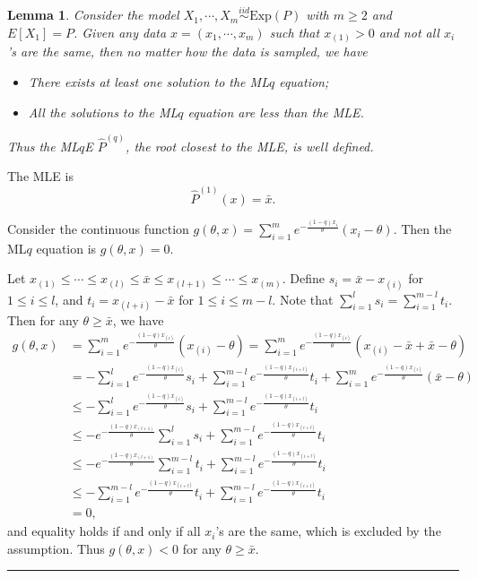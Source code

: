 \documentclass[a4paper]{article}
\newenvironment{proof}{{\bf Proof:  }}{\hfill\rule{2mm}{2mm}}
\newtheorem{lemma}[fact]{Lemma}
\renewcommand{\hat}{\widehat}
\begin{document}
\begin{lemma}
\label{lemma:LqlMLE}
Consider the model $X_1, \cdots, X_m \stackrel{iid}{\sim} \mathrm{Exp}(P)$ with $m \ge 2$ and $E[X_1] = P$. Given any data $x = (x_1, \cdots, x_m)$ such that $x_{(1)} > 0$ and not all $x_i$'s are the same, then no matter how the data is sampled, we have
\begin{itemize}
\item There exists at least one solution to the ML$q$ equation;
\item All the solutions to the ML$q$ equation are less than the MLE.
\end{itemize}
Thus the ML$q$E $\hat{P}^{(q)}$, the root closest to the MLE, is well defined.
\end{lemma}
\begin{proof}
The MLE is
\[
	\hat{P}^{(1)}(x) = \bar{x}.
\]

Consider the continuous function $g(\theta, x) = \sum_{i=1}^m e^{-\frac{(1-q)x_i}{\theta}}(x_i - \theta)$. Then the ML$q$ equation is $g(\theta, x) = 0$.

Let $x_{(1)} \le \cdots \le x_{(l)} \le \bar{x} \le x_{(l+1)} \le \cdots \le x_{(m)}$. Define $s_i = \bar{x} - x_{(i)}$ for $1 \le i \le l$, and $t_{i} = x_{(l+i)} - \bar{x}$ for $1 \le i \le m - l$. Note that $\sum_{i=1}^l s_i = \sum_{i=1}^{m-l} t_i$. Then for any $\theta \ge \bar{x}$, we have
\begin{align*}
g(\theta, x) & = \sum_{i=1}^m e^{-\frac{(1-q)x_{(i)}}{\theta}}(x_{(i)} - \theta)
= \sum_{i=1}^m e^{-\frac{(1-q)x_{(i)}}{\theta}}(x_{(i)} - \bar{x} + \bar{x} - \theta) \\
& = - \sum_{i=1}^l e^{-\frac{(1-q)x_{(i)}}{\theta}}s_i
+ \sum_{i=1}^{m-l} e^{-\frac{(1-q)x_{(i+l)}}{\theta}}t_i
+ \sum_{i=1}^m e^{-\frac{(1-q)x_{(i)}}{\theta}}(\bar{x} - \theta)\\
& \le - \sum_{i=1}^l e^{-\frac{(1-q)x_{(i)}}{\theta}}s_i
+ \sum_{i=1}^{m-l} e^{-\frac{(1-q)x_{(i+l)}}{\theta}}t_i \\
& \le - e^{-\frac{(1-q)x_{(l+1)}}{\theta}} \sum_{i=1}^l s_i
+ \sum_{i=1}^{m-l} e^{-\frac{(1-q)x_{(i+l)}}{\theta}}t_i \\
& \le - e^{-\frac{(1-q)x_{(l+1)}}{\theta}} \sum_{i=1}^{m-l} t_i
+ \sum_{i=1}^{m-l} e^{-\frac{(1-q)x_{(i+l)}}{\theta}}t_i \\
& \le - \sum_{i=1}^{m-l} e^{-\frac{(1-q)x_{(i+l)}}{\theta}}t_i
+ \sum_{i=1}^{m-l} e^{-\frac{(1-q)x_{(i+l)}}{\theta}}t_i\\
& = 0,
\end{align*}
and equality holds if and only if all $x_i$'s are the same, which is excluded by the assumption.
Thus $g(\theta, x) < 0$ for any $\theta \ge \bar{x}$.


\end{proof}
\end{document}
